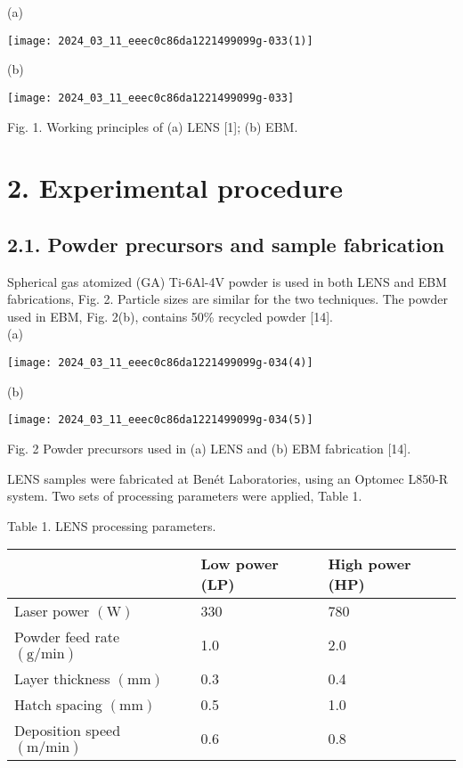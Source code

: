 \documentclass[10pt]{article}
\begin{document}
(a)

\begin{center}
\texttt{[image: 2024\_03\_11\_eeec0c86da1221499099g-033(1)]}
\end{center}

(b)

\begin{center}
\texttt{[image: 2024\_03\_11\_eeec0c86da1221499099g-033]}
\end{center}

Fig. 1. Working principles of (a) LENS [1]; (b) EBM.

\section*{2. Experimental procedure}
\subsection*{2.1. Powder precursors and sample fabrication}
Spherical gas atomized (GA) Ti-6Al-4V powder is used in both LENS and EBM fabrications, Fig. 2. Particle sizes are similar for the two techniques. The powder used in EBM, Fig. 2(b), contains 50\% recycled powder [14].\\
(a)

\begin{center}
\texttt{[image: 2024\_03\_11\_eeec0c86da1221499099g-034(4)]}
\end{center}

(b)

\begin{center}
\texttt{[image: 2024\_03\_11\_eeec0c86da1221499099g-034(5)]}
\end{center}

Fig. 2 Powder precursors used in (a) LENS and (b) EBM fabrication [14].

LENS samples were fabricated at Benét Laboratories, using an Optomec L850-R system. Two sets of processing parameters were applied, Table 1.

Table 1. LENS processing parameters.

\begin{center}
\begin{tabular}{lll}
\hline
 & Low power (LP) & High power (HP) \\
\hline
Laser power $(\mathrm{W})$ & 330 & 780 \\
Powder feed rate $(\mathrm{g} / \mathrm{min})$ & 1.0 & 2.0 \\
Layer thickness $(\mathrm{mm})$ & 0.3 & 0.4 \\
Hatch spacing $(\mathrm{mm})$ & 0.5 & 1.0 \\
Deposition speed $(\mathrm{m} / \mathrm{min})$ & 0.6 & 0.8 \\
\hline
\end{tabular}
\end{center}
\end{document}
